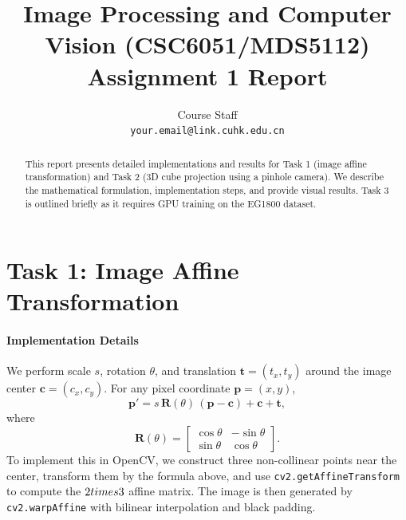 \documentclass[final]{cvpr}
\begin{document}
\title{Image Processing and Computer Vision (CSC6051/MDS5112)\\Assignment 1 Report}

\author{Course Staff\\
{\tt\small your.email@link.cuhk.edu.cn}}

\maketitle

\begin{abstract}
This report presents detailed implementations and results for Task 1 (image affine transformation) and Task 2 (3D cube projection using a pinhole camera). We describe the mathematical formulation, implementation steps, and provide visual results. Task 3 is outlined briefly as it requires GPU training on the EG1800 dataset.
\end{abstract}

\section{Task 1: Image Affine Transformation}

\paragraph{Implementation Details}
We perform scale $s$, rotation $\theta$, and translation $\mathbf{t}=(t_x,t_y)$ around the image center $\mathbf{c}=(c_x,c_y)$. For any pixel coordinate $\mathbf{p}=(x,y)$,
\begin{equation}
\mathbf{p}' = s\,\mathbf{R}(\theta)\,(\mathbf{p}-\mathbf{c}) + \mathbf{c} + \mathbf{t},
\end{equation}
where
\begin{equation}
\mathbf{R}(\theta) =
\begin{bmatrix}
\cos\theta & -\sin\theta \\
\sin\theta & \cos\theta
\end{bmatrix}.
\end{equation}
To implement this in OpenCV, we construct three non-collinear points near the center, transform them by the formula above, and use \texttt{cv2.getAffineTransform} to compute the $2\\times 3$ affine matrix. The image is then generated by \texttt{cv2.warpAffine} with bilinear interpolation and black padding.
\end{document}
